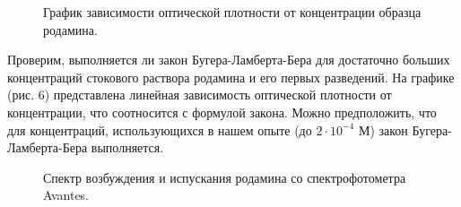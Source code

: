 \documentclass{article}
\begin{document}
\begin{figure}[h!]
    \caption{График зависимости оптической плотности от концентрации образца родамина.}
\end{figure}
\par Проверим, выполняется ли закон Бугера-Ламберта-Бера для достаточно больших концентраций стокового раствора родамина и его первых разведений. На графике (рис. 6) представлена линейная зависимость оптической плотности от концентрации, что соотносится с формулой закона. Можно предположить, что для концентраций, использующихся в нашем опыте (до $2 \cdot 10^{-4}$ М) закон Бугера-Ламберта-Бера выполняется.
\begin{figure}[h!]
    \caption{Спектр возбуждения и испускания родамина со спектрофотометра Avantes.}
\end{figure}
\end{document}
